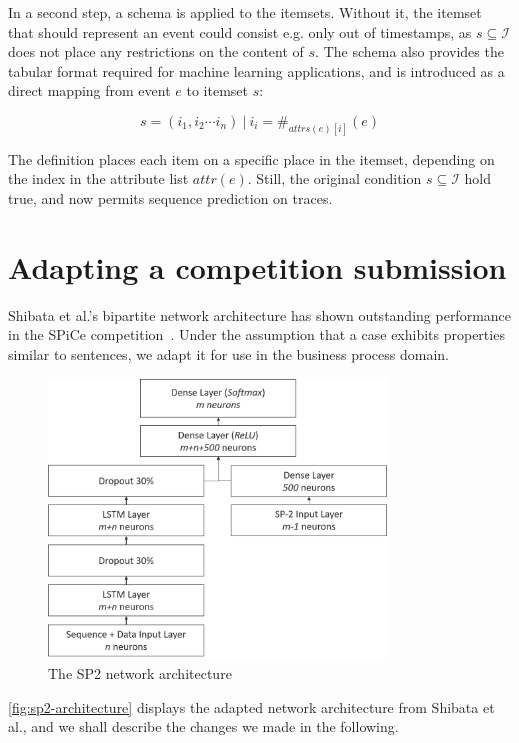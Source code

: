 In a second step, a schema is applied to the itemsets. Without it, the itemset that should represent an event could consist e.g. only out of timestamps, as $s \subseteq \mathscr{I}$ does not place any restrictions on the content of $s$.
The schema also provides the tabular format required for machine learning applications, and is introduced as a direct mapping from event $e$ to itemset $s$:

$$ s = (i_1, i_2 \cdots i_n)\ |\ i_i = \#_{attrs(e)[i]}(e) $$

The definition places each item on a specific place in the itemset, depending on the index in the attribute list $attr(e)$. Still, the original condition $s \subseteq \mathscr{I}$ hold true, and now permits sequence prediction on traces.

\section{Adapting a competition submission}\label{sec:contrib:sp2-inspiration}
Shibata et al.'s bipartite network architecture has shown outstanding performance in the SPiCe competition~\cite{web:spice}. Under the assumption that a case exhibits properties similar to sentences, we adapt it for use in the business process domain.

\begin{figure}[!htb]
    \centering
    \includegraphics[width=0.8\textwidth]{gfx/sp2-network-architecture.png}
    \caption{The SP2 network architecture}
    \label{fig:sp2-architecture}
\end{figure}

\autoref{fig:sp2-architecture} displays the adapted network architecture from Shibata et al., and we shall describe the changes we made in the following.

